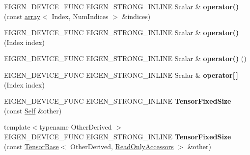 \begin{DoxyCompactItemize}
\item 
\mbox{\label{class_eigen_1_1_tensor_fixed_size_a656cb9e7ff25fb122c8e287431b7df95}} 
E\+I\+G\+E\+N\+\_\+\+D\+E\+V\+I\+C\+E\+\_\+\+F\+U\+NC E\+I\+G\+E\+N\+\_\+\+S\+T\+R\+O\+N\+G\+\_\+\+I\+N\+L\+I\+NE Scalar \& {\bfseries operator()} (const \hyperlink{class_eigen_1_1array}{array}$<$ Index, Num\+Indices $>$ \&indices)
\item 
\mbox{\label{class_eigen_1_1_tensor_fixed_size_abc69263e2a0c5fa47238a2b3fd591a63}} 
E\+I\+G\+E\+N\+\_\+\+D\+E\+V\+I\+C\+E\+\_\+\+F\+U\+NC E\+I\+G\+E\+N\+\_\+\+S\+T\+R\+O\+N\+G\+\_\+\+I\+N\+L\+I\+NE Scalar \& {\bfseries operator()} (Index index)
\item 
\mbox{\label{class_eigen_1_1_tensor_fixed_size_a17b0f692638b3b0cbf27eb52ac8bec38}} 
E\+I\+G\+E\+N\+\_\+\+D\+E\+V\+I\+C\+E\+\_\+\+F\+U\+NC E\+I\+G\+E\+N\+\_\+\+S\+T\+R\+O\+N\+G\+\_\+\+I\+N\+L\+I\+NE Scalar \& {\bfseries operator()} ()
\item 
\mbox{\label{class_eigen_1_1_tensor_fixed_size_ae9094e44629422c8fa3516ab84ccf48d}} 
E\+I\+G\+E\+N\+\_\+\+D\+E\+V\+I\+C\+E\+\_\+\+F\+U\+NC E\+I\+G\+E\+N\+\_\+\+S\+T\+R\+O\+N\+G\+\_\+\+I\+N\+L\+I\+NE Scalar \& {\bfseries operator\mbox{[}$\,$\mbox{]}} (Index index)
\item 
\mbox{\label{class_eigen_1_1_tensor_fixed_size_a2d634d188e4393f8b41f72e3e5022b70}} 
E\+I\+G\+E\+N\+\_\+\+D\+E\+V\+I\+C\+E\+\_\+\+F\+U\+NC E\+I\+G\+E\+N\+\_\+\+S\+T\+R\+O\+N\+G\+\_\+\+I\+N\+L\+I\+NE {\bfseries Tensor\+Fixed\+Size} (const \hyperlink{class_eigen_1_1_tensor_fixed_size}{Self} \&other)
\item 
\mbox{\label{class_eigen_1_1_tensor_fixed_size_aaf625b2a75378a0ee259a7fb40080f9c}} 
{\footnotesize template$<$typename Other\+Derived $>$ }\\E\+I\+G\+E\+N\+\_\+\+D\+E\+V\+I\+C\+E\+\_\+\+F\+U\+NC E\+I\+G\+E\+N\+\_\+\+S\+T\+R\+O\+N\+G\+\_\+\+I\+N\+L\+I\+NE {\bfseries Tensor\+Fixed\+Size} (const \hyperlink{class_eigen_1_1_tensor_base}{Tensor\+Base}$<$ Other\+Derived, \hyperlink{group__enums_gga9f93eac38eb83deb0e8dbd42ddf11d5da42865f87356ad7e585a1bfbfd1b81699}{Read\+Only\+Accessors} $>$ \&other)

\end{DoxyCompactItemize}
